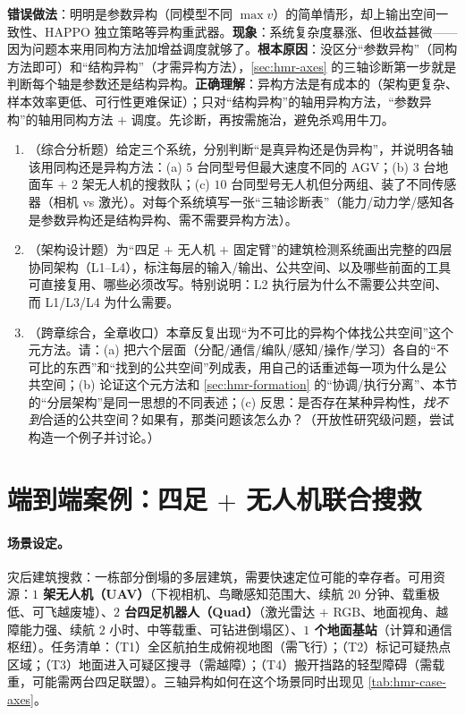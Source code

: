 \begin{pitfall}
\textbf{错误做法}：明明是参数异构（同模型不同 $\max v$）的简单情形，却上输出空间一致性、HAPPO 独立策略等异构重武器。\textbf{现象}：系统复杂度暴涨、但收益甚微——因为问题本来用同构方法加增益调度就够了。\textbf{根本原因}：没区分“参数异构”（同构方法即可）和“结构异构”（才需异构方法），\cref{sec:hmr-axes} 的三轴诊断第一步就是判断每个轴是参数还是结构异构。\textbf{正确理解}：异构方法是有成本的（架构更复杂、样本效率更低、可行性更难保证）；只对“结构异构”的轴用异构方法，“参数异构”的轴用同构方法 $+$ 调度。先诊断，再按需施治，避免杀鸡用牛刀。
\end{pitfall}

\begin{practice}
\begin{enumerate}
  \item （综合分析题）给定三个系统，分别判断“是真异构还是伪异构”，并说明各轴该用同构还是异构方法：(a) $5$ 台同型号但最大速度不同的 AGV；(b) $3$ 台地面车 $+$ $2$ 架无人机的搜救队；(c) $10$ 台同型号无人机但分两组、装了不同传感器（相机 vs 激光）。对每个系统填写一张“三轴诊断表”（能力/动力学/感知各是参数异构还是结构异构、需不需要异构方法）。
  \item （架构设计题）为“四足 $+$ 无人机 $+$ 固定臂”的建筑检测系统画出完整的四层协同架构（L1--L4），标注每层的输入/输出、公共空间、以及哪些前面的工具可直接复用、哪些必须改写。特别说明：L2 执行层为什么不需要公共空间、而 L1/L3/L4 为什么需要。
  \item （跨章综合，全章收口）本章反复出现“为不可比的异构个体找公共空间”这个元方法。请：(a) 把六个层面（分配/通信/编队/感知/操作/学习）各自的“不可比的东西”和“找到的公共空间”列成表，用自己的话重述每一项为什么是公共空间；(b) 论证这个元方法和 \cref{sec:hmr-formation} 的“协调/执行分离”、本节的“分层架构”是同一思想的不同表述；(c) 反思：是否存在某种异构性，\emph{找不到}合适的公共空间？如果有，那类问题该怎么办？（开放性研究级问题，尝试构造一个例子并讨论。）
\end{enumerate}
\end{practice}

\section{端到端案例：四足 $+$ 无人机联合搜救}
\label{sec:hmr-case}

\paragraph{场景设定。}
灾后建筑搜救：一栋部分倒塌的多层建筑，需要快速定位可能的幸存者。可用资源：\textbf{$1$ 架无人机（UAV）}（下视相机、鸟瞰感知范围大、续航 $20$ 分钟、载重极低、可飞越废墟）、\textbf{$2$ 台四足机器人（Quad）}（激光雷达 $+$ RGB、地面视角、越障能力强、续航 $2$ 小时、中等载重、可钻进倒塌区）、\textbf{$1$ 个地面基站}（计算和通信枢纽）。任务清单：（T1）全区航拍生成俯视地图（需飞行）；（T2）标记可疑热点区域；（T3）地面进入可疑区搜寻（需越障）；（T4）搬开挡路的轻型障碍（需载重，可能需两台四足联盟）。三轴异构如何在这个场景同时出现见 \cref{tab:hmr-case-axes}。

